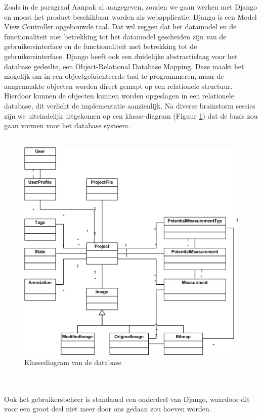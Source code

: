 \noindent Zoals in de paragraaf Aanpak al aangegeven, zouden we gaan werken met Django en moest het product beschikbaar worden als webapplicatie.
Django is een Model View Controller opgebouwde taal.
Dat wil zeggen dat het datamodel en de functionaliteit met betrekking tot het datamodel gescheiden zijn van de gebruikersinterface en de functionaliteit met betrekking tot de gebruikersinterface.
Django heeft ook een duidelijke abstractielaag voor het database gedeelte, een Object-Relational Database Mapping.
Deze maakt het mogelijk om in een object\-ge\"{o}rienteerde taal te programmeren, maar de aangemaakte objecten worden direct gemapt op een relationele structuur. Hierdoor kunnen de objecten kunnen worden opgeslagen in een relationele database, dit verlicht de implementatie aanzienlijk.
Na diverse brainstorm sessies zijn we uiteindelijk uitgekomen op een klasse-diagram (Figuur \ref{fig:databasediagram}) dat de basis zou gaan vormen voor het database systeem.
\\
\\
\begin{figure}[htbp]
\includegraphics[width=\textwidth]{databasediagram}
\caption{Klassediagram van de database}
\label{fig:databasediagram}
\end{figure}
\\
\\
Ook het gebruikers\-beheer is standaard een onderdeel van Django, waardoor dit voor een groot deel niet meer door ons gedaan zou hoeven worden.

